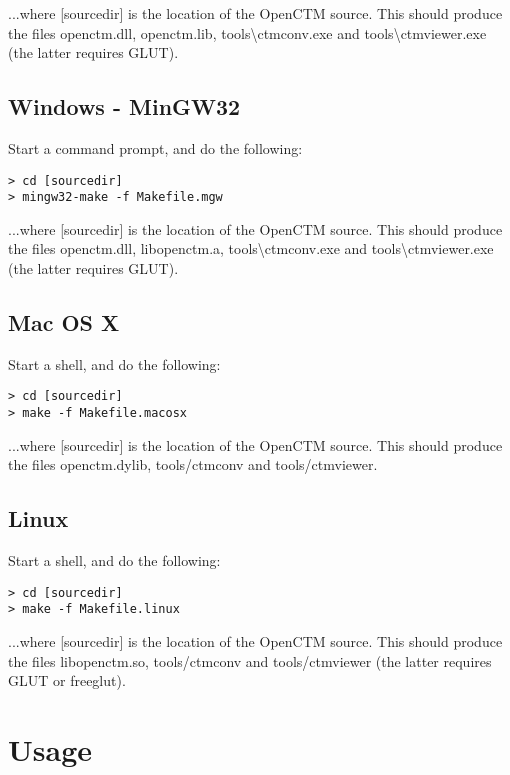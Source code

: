 ...where [sourcedir] is the location of the OpenCTM source. This should produce
the files openctm.dll, openctm.lib, tools\textbackslash ctmconv.exe and
tools\textbackslash ctmviewer.exe (the latter requires GLUT).


\section{Windows - MinGW32}
Start a command prompt, and do the following:

\begin{lstlisting}
> cd [sourcedir]
> mingw32-make -f Makefile.mgw
\end{lstlisting}

...where [sourcedir] is the location of the OpenCTM source. This should produce
the files openctm.dll, libopenctm.a, tools\textbackslash ctmconv.exe and
tools\textbackslash ctmviewer.exe (the latter requires GLUT).


\section{Mac OS X}
Start a shell, and do the following:

\begin{lstlisting}
> cd [sourcedir]
> make -f Makefile.macosx
\end{lstlisting}

...where [sourcedir] is the location of the OpenCTM source. This should produce
the files openctm.dylib, tools/ctmconv and tools/ctmviewer.


\section{Linux}
Start a shell, and do the following:

\begin{lstlisting}
> cd [sourcedir]
> make -f Makefile.linux
\end{lstlisting}

...where [sourcedir] is the location of the OpenCTM source. This should produce
the files libopenctm.so, tools/ctmconv and tools/ctmviewer (the latter requires
GLUT or freeglut).




\chapter{Usage}

